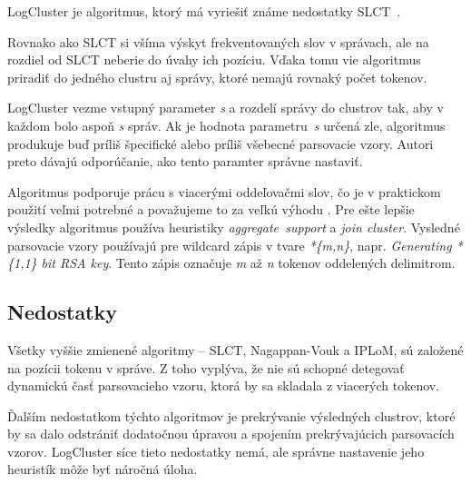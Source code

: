 LogCluster je algoritmus, ktorý má vyriešiť známe nedostatky SLCT~\parencite{logcluster}. 
\par Rovnako ako SLCT si všíma výskyt frekventovaných slov v správach, ale na rozdiel od SLCT neberie do úvahy ich pozíciu. Vďaka tomu vie algoritmus priradiť do jedného clustru aj správy, ktoré nemajú rovnaký počet tokenov. 
\par LogCluster vezme vstupný parameter \emph{s} a rozdelí správy do clustrov tak, aby v každom bolo aspoň \emph{s} správ. Ak je hodnota parametru~\emph{s} určená zle, algoritmus produkuje buď príliš špecifické alebo príliš všebecné parsovacie vzory. Autori preto dávajú odporúčanie, ako tento paramter správne nastaviť. 
\par Algoritmus podporuje prácu s viacerými oddeľovačmi slov, čo je v praktickom použití veľmi potrebné a považujeme to za veľkú výhodu \parencite{logclustertool}. Pre ešte lepšie výsledky algoritmus používa heuristiky \emph{aggregate\, support} a \emph{join cluster}. Vysledné parsovacie vzory používajú pre wildcard zápis v tvare \emph{*\{m,n\}}, napr. \emph{Generating *\{1,1\} bit RSA key}. Tento zápis označuje \emph{m} až \emph{n} tokenov oddelených delimitrom.


\subsection{Nedostatky}
Všetky vyššie zmienené algoritmy -- SLCT, Nagappan-Vouk a IPLoM, sú založené na pozícii tokenu v správe. Z toho vyplýva, že nie sú schopné detegovať dynamickú časť parsovacieho vzoru, ktorá by sa skladala z viacerých tokenov. 
\par Ďalším nedostatkom týchto algoritmov je prekrývanie výsledných clustrov, ktoré by sa dalo odstrániť dodatočnou úpravou a spojením prekrývajúcich parsovacích vzorov. LogCluster síce tieto nedostatky nemá, ale správne nastavenie jeho heuristík môže byť náročná úloha.